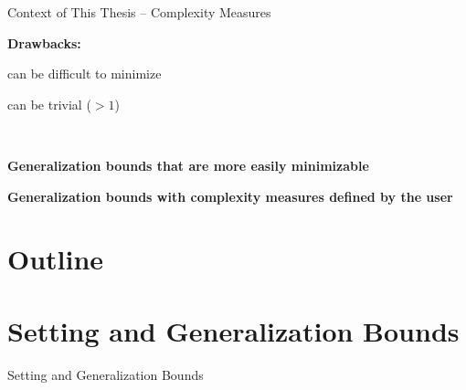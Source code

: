 \documentclass{slides}
\begin{document}
\begin{xframe}{Context of This Thesis -- {\small Complexity Measures}}

  \begin{redbox}{}
  \begin{figure}
  \centering
  
  \end{figure}
  \vspace{-0.3cm}
  {\bf Drawbacks:}
  \begin{xitemize}
  \item[\red{\bf --} ] can be difficult to minimize
  \item[\red{\bf --} ] can be trivial ($> 1$)
  \end{xitemize}
  \end{redbox}
  
  \vspace{-0.3cm}
  
  \begin{xblock}{}
  \\[0.2cm]
   \begin{xitemize}
    \item {\bf Generalization bounds that are more easily minimizable}\\
    \item {\bf Generalization bounds with complexity measures defined by the user}\\
\end{xitemize}
  \end{xblock}

\end{xframe}


\section*{Outline}


\section{Setting and Generalization Bounds}
\begin{xtitle}
{\huge Setting and Generalization Bounds}
\end{xtitle}
\end{document}
